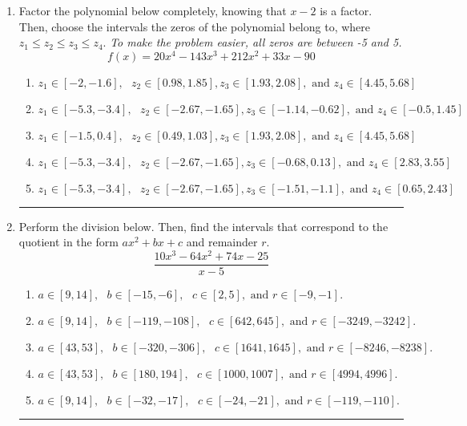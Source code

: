 \documentclass[14pt]{extbook}
\newcommand{\litem}[1]{\item#1\hspace*{-1cm}\rule{\textwidth}{0.4pt}}
\begin{document}
\begin{enumerate}
{\begin{enumerate}[label=\Alph*.]
\end{enumerate} }
\litem{
Factor the polynomial below completely, knowing that $x -2$ is a factor. Then, choose the intervals the zeros of the polynomial belong to, where $z_1 \leq z_2 \leq z_3 \leq z_4$. \textit{To make the problem easier, all zeros are between -5 and 5.}\[ f(x) = 20x^{4} -143 x^{3} +212 x^{2} +33 x -90 \]\begin{enumerate}[label=\Alph*.]
\item \( z_1 \in [-2, -1.6], \text{   }  z_2 \in [0.98, 1.85], z_3 \in [1.93, 2.08], \text{   and   } z_4 \in [4.45, 5.68] \)
\item \( z_1 \in [-5.3, -3.4], \text{   }  z_2 \in [-2.67, -1.65], z_3 \in [-1.14, -0.62], \text{   and   } z_4 \in [-0.5, 1.45] \)
\item \( z_1 \in [-1.5, 0.4], \text{   }  z_2 \in [0.49, 1.03], z_3 \in [1.93, 2.08], \text{   and   } z_4 \in [4.45, 5.68] \)
\item \( z_1 \in [-5.3, -3.4], \text{   }  z_2 \in [-2.67, -1.65], z_3 \in [-0.68, 0.13], \text{   and   } z_4 \in [2.83, 3.55] \)
\item \( z_1 \in [-5.3, -3.4], \text{   }  z_2 \in [-2.67, -1.65], z_3 \in [-1.51, -1.1], \text{   and   } z_4 \in [0.65, 2.43] \)

\end{enumerate} }
\litem{
Perform the division below. Then, find the intervals that correspond to the quotient in the form $ax^2+bx+c$ and remainder $r$.\[ \frac{10x^{3} -64 x^{2} +74 x -25}{x -5} \]\begin{enumerate}[label=\Alph*.]
\item \( a \in [9, 14], \text{   } b \in [-15, -6], \text{   } c \in [2, 5], \text{   and   } r \in [-9, -1]. \)
\item \( a \in [9, 14], \text{   } b \in [-119, -108], \text{   } c \in [642, 645], \text{   and   } r \in [-3249, -3242]. \)
\item \( a \in [43, 53], \text{   } b \in [-320, -306], \text{   } c \in [1641, 1645], \text{   and   } r \in [-8246, -8238]. \)
\item \( a \in [43, 53], \text{   } b \in [180, 194], \text{   } c \in [1000, 1007], \text{   and   } r \in [4994, 4996]. \)
\item \( a \in [9, 14], \text{   } b \in [-32, -17], \text{   } c \in [-24, -21], \text{   and   } r \in [-119, -110]. \)


\end{enumerate}}
\end{enumerate}
\end{document}
